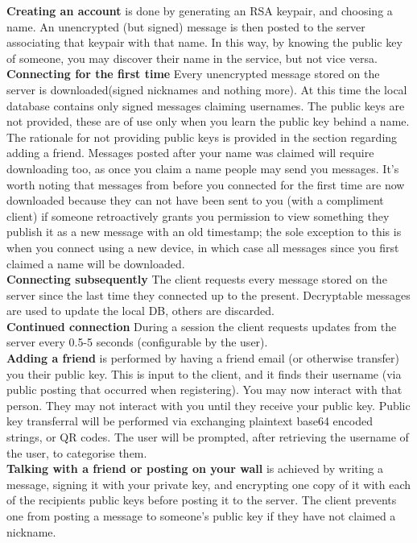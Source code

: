 \textbf{Creating an account} is done by generating an RSA keypair, and choosing
a name. An unencrypted (but signed) message is then posted to the server
associating that keypair with that name. In this way, by knowing the public key
of someone, you may discover their name in the service, but not vice versa.\\

\textbf{Connecting for the first time} Every unencrypted message stored on the
server is downloaded(signed nicknames and nothing more). At this time the local
database contains only signed messages claiming usernames. The public keys are 
not provided, these are of use only when you learn the public key behind a name. 
The rationale for not providing public keys is provided in the section regarding 
adding a friend. Messages posted after your name was claimed will require 
downloading too, as once you claim a name people may send you messages. It's 
worth noting that messages from before you connected for the first time are now 
downloaded because they can not have been sent to you (with a compliment client) 
if someone retroactively grants you permission to view something they publish it 
as a new message with an old timestamp; the sole exception to this is when you 
connect using a new device, in which case all messages since you first claimed a 
name will be downloaded.\\

\textbf{Connecting subsequently} The client requests every message stored on the
server since the last time they connected up to the present. Decryptable
messages are used to update the local DB, others are discarded.\\

\textbf{Continued connection} During a session the client requests updates from
the server every 0.5-5 seconds (configurable by the user).\\

\textbf{Adding a friend} is performed by having a friend email (or otherwise
transfer) you their public key. This is input to the client, and it finds their
username (via public posting that occurred when registering). You may now
interact with that person. They may not interact with you until they receive
your public key. Public key transferral will be performed via exchanging plaintext
base64 encoded strings, or QR codes. The user will be prompted, after retrieving
the username of the user, to categorise them.\\

\textbf{Talking with a friend or posting on your wall} is achieved by writing
a message, signing it with your private key, and encrypting one copy of it with
each of the recipients public keys before posting it to the server. The client
prevents one from posting a message to someone's public key if they have not
claimed a nickname.\\

